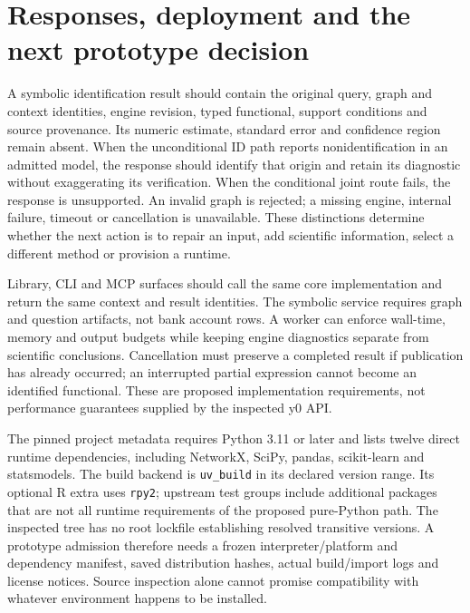 \hypertarget{responses-deployment-and-the-next-prototype-decision}{%
\section{Responses, deployment and the next prototype
decision}\label{responses-deployment-and-the-next-prototype-decision}}

A symbolic identification result should contain the original query,
graph and context identities, engine revision, typed functional, support
conditions and source provenance. Its numeric estimate, standard error
and confidence region remain absent. When the unconditional ID path
reports nonidentification in an admitted model, the response should
identify that origin and retain its diagnostic without exaggerating its
verification. When the conditional joint route fails, the response is
unsupported. An invalid graph is rejected; a missing engine, internal
failure, timeout or cancellation is unavailable. These distinctions
determine whether the next action is to repair an input, add scientific
information, select a different method or provision a runtime.

Library, CLI and MCP surfaces should call the same core implementation
and return the same context and result identities. The symbolic service
requires graph and question artifacts, not bank account rows. A worker
can enforce wall-time, memory and output budgets while keeping engine
diagnostics separate from scientific conclusions. Cancellation must
preserve a completed result if publication has already occurred; an
interrupted partial expression cannot become an identified functional.
These are proposed implementation requirements, not performance
guarantees supplied by the inspected y0 API.

The pinned project metadata requires Python 3.11 or later and lists
twelve direct runtime dependencies, including NetworkX, SciPy, pandas,
scikit-learn and statsmodels. The build backend is \texttt{uv\_build} in
its declared version range. Its optional R extra uses \texttt{rpy2};
upstream test groups include additional packages that are not all
runtime requirements of the proposed pure-Python path. The inspected
tree has no root lockfile establishing resolved transitive versions. A
prototype admission therefore needs a frozen interpreter/platform and
dependency manifest, saved distribution hashes, actual build/import logs
and license notices. Source inspection alone cannot promise
compatibility with whatever environment happens to be installed.
\citep{exec13_y0_metadata,exec13_y0_tree}

